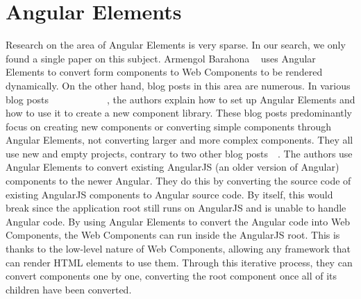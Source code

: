 \section{Angular Elements}
Research on the area of Angular Elements is very sparse. In our search, we only found a single paper on this subject. Armengol Barahona \etal{}~\cite{armengol2020development} uses Angular Elements to convert form components to Web Components to be rendered dynamically. On the other hand, blog posts in this area are numerous. In various blog posts~~~~~~~~~~~~, the authors explain how to set up Angular Elements and how to use it to create a new component library. These blog posts predominantly focus on creating new components or converting simple components through Angular Elements, not converting larger and more complex components. They all use new and empty projects, contrary to two other blog posts~~. The authors use Angular Elements to convert existing AngularJS (an older version of Angular) components to the newer Angular. They do this by converting the source code of existing AngularJS components to Angular source code. By itself, this would break since the application root still runs on AngularJS and is unable to handle Angular code. By using Angular Elements to convert the Angular code into Web Components, the Web Components can run inside the AngularJS root. This is thanks to the low-level nature of Web Components, allowing any framework that can render HTML elements to use them. Through this iterative process, they can convert components one by one, converting the root component once all of its children have been converted.

